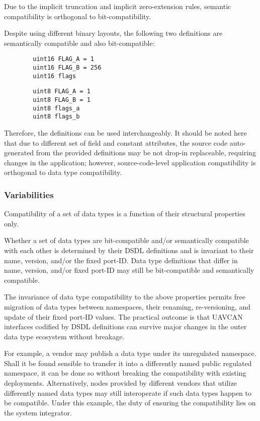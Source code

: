 Due to the implicit truncation and implicit zero-extension rules,
semantic compatibility is orthogonal to bit-compatibility.

\begin{remark}[breakable]
    Despite using different binary layouts, the following two definitions are semantically compatible
    and also bit-compatible:

    \begin{verbatim}
        uint16 FLAG_A = 1
        uint16 FLAG_B = 256
        uint16 flags
    \end{verbatim}

    \begin{verbatim}
        uint8 FLAG_A = 1
        uint8 FLAG_B = 1
        uint8 flags_a
        uint8 flags_b
    \end{verbatim}

    Therefore, the definitions can be used interchangeably.
    It should be noted here that due to different set of field and constant attributes,
    the source code auto-generated from the provided definitions may be not drop-in replaceable,
    requiring changes in the application;
    however, source-code-level application compatibility is orthogonal to data type compatibility.
\end{remark}

\subsubsection{Variabilities}

Compatibility of a set of data types is a function of their structural properties only.

Whether a set of data types are bit-compatible and/or semantically compatible with each other
is determined by their DSDL definitions and is invariant to their name, version, and/or the fixed port-ID.
Data type definitions that differ in name, version, and/or fixed port-ID may still be
bit-compatible and semantically compatible.

\begin{remark}
    The invariance of data type compatibility to the above properties permits free migration of
    data types between namespaces, their renaming, re-versioning, and update of their fixed port-ID values.
    The practical outcome is that UAVCAN interfaces codified by DSDL definitions can survive
    major changes in the outer data type ecosystem without breakage.

    For example, a vendor may publish a data type under its unregulated namespace.
    Shall it be found sensible to transfer it into a differently named public regulated namespace,
    it can be done so without breaking the compatibility with existing deployments.
    Alternatively, nodes provided by different vendors that utilize differently named data types may
    still interoperate if such data types happen to be compatible.
    Under this example, the duty of ensuring the compatibility lies on the system integrator.
\end{remark}

